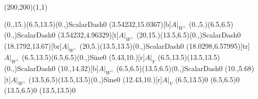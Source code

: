 \unitlength=1bp%

\begin{feynartspicture}(200,200)(1,1)

\FADiagram{}
\FAProp(0.,15.)(6.5,13.5)(0.,){ScalarDash}{0}
\FALabel(3.54232,15.0367)[b]{$A|_{W^\perp}$}
\FAProp(0.,5.)(6.5,6.5)(0.,){ScalarDash}{0}
\FALabel(3.54232,4.96329)[t]{$A|_{W^\perp}$}
\FAProp(20,15.)(13.5,6.5)(0.,){ScalarDash}{0}
\FALabel(18.1792,13.67)[br]{$A|_{W^\perp}$}
\FAProp(20,5.)(13.5,13.5)(0.,){ScalarDash}{0}
\FALabel(18.0298,6.57995)[tr]{$A|_{W^\perp}$}
\FAProp(6.5,13.5)(6.5,6.5)(0.,){Sine}{0}
\FALabel(5.43,10.)[r]{$A|_V$}
\FAProp(6.5,13.5)(13.5,13.5)(0.,){ScalarDash}{0}
\FALabel(10.,14.32)[b]{$A|_{W^\perp}$}
\FAProp(6.5,6.5)(13.5,6.5)(0.,){ScalarDash}{0}
\FALabel(10.,5.68)[t]{$A|_{W^\perp}$}
\FAProp(13.5,6.5)(13.5,13.5)(0.,){Sine}{0}
\FALabel(12.43,10.)[r]{$A|_V$}
\FAVert(6.5,13.5){0}
\FAVert(6.5,6.5){0}
\FAVert(13.5,6.5){0}
\FAVert(13.5,13.5){0}
\end{feynartspicture}

